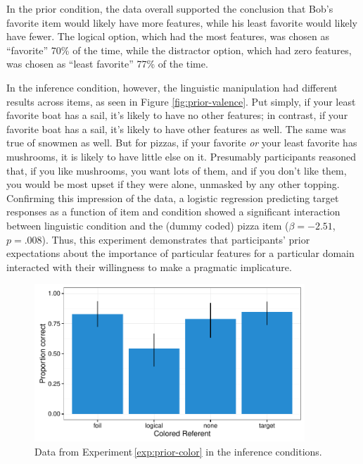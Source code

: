 \documentclass[man,noapacite]{apa2}
\newcounter{Experiment}
\newcommand{\exptref}[1]{Experiment\,\ref{#1}}
\begin{document}
In the prior condition, the data overall supported the conclusion that Bob's favorite item would likely have more features, while his least favorite would likely have fewer. The logical option, which had the most features, was chosen as ``favorite'' 70\% of the time, while the distractor option, which had zero features, was chosen as ``least favorite'' 77\% of the time.

In the inference condition, however, the linguistic manipulation had different results across items, as seen in Figure \ref{fig:prior-valence}. Put simply, if your least favorite boat has a sail, it's likely to have no other features; in contrast, if your favorite boat has a sail, it's likely to have other features as well. The same was true of snowmen as well. But for pizzas, if your favorite \emph{or} your least favorite has mushrooms, it is likely to have little else on it. Presumably participants reasoned that, if you like mushrooms, you want lots of them, and if you don't like them, you would be most upset if they were alone, unmasked by any other topping. Confirming this impression of the data, a logistic regression predicting target responses as a function of item and condition showed a significant interaction between linguistic condition and the (dummy coded) pizza item ($\beta = -2.51$, $p = .008$). Thus, this experiment demonstrates that participants' prior expectations about the importance of particular features for a particular domain interacted with their willingness to make a pragmatic implicature.

\begin{figure}[t]
  \centering
  \includegraphics[width=4in]{../plots/2-prior-color.pdf}
  \caption{\label{fig:prior-color} Data from \exptref{exp:prior-color} in the inference conditions.}
\end{figure}
\end{document}
